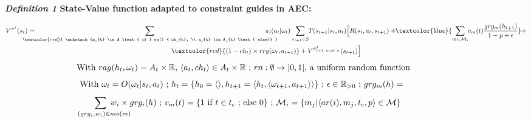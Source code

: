 \begin{figure}[h!]
    \label{eq:single_value_function}
    \raggedright
    \textbf{\textit{Definition 1} \quad State-Value function adapted to constraint guides in AEC:}
    
    \begin{scriptsize}
        \vspace{-0.6cm}
        \begin{gather*}
            V^{\pi^j}(s_t) = \hspace{-0.75cm}
            \sum_{\textcolor{red}{ \substack{a_{t} \in A \text{ if } rn() < ch_{t}, \\
                        a_{t} \in A_{t} \text{ else}}
                }}{\hspace{-0.7cm} \pi_i(a_{t} | \omega_t)}
            \sum_{s_{t+1} \in S}
            {\hspace{-0.1cm} T(s_{t+1} | s_t, a_{t})
            \Bigl[R(s_t,a_{t},s_{t+1}) + \hspace{-0.1cm}
            \textcolor{blue}{ \sum_{m \in \mathcal{M}_i}{ \hspace{-0.1cm} v_m(t) \frac{grg_m(h_{t+1})}{1 - p + \epsilon} } }
            + } \\
            {\textcolor{red}{(1-ch_t) \times rrg(\omega_t,a_{t+1})} + V^{\pi^j_{i+1 \ mod \ n}}(s_{t+1})\Bigr]}
        \end{gather*}
        \vspace{-0.5cm}
        \textcolor{red}{\[\text{ \hspace{-0.1cm} With } rag(h_t, \omega_t) = A_{t} \times \mathbb{R} \text{, } \langle a_t, ch_{t} \rangle \in A_{t} \times \mathbb{R} \text{ ; } rn: \emptyset \to [0,1[ \text{, a uniform random function}\]}
        \vspace{-0.6cm}
        \textcolor{blue}{
            \begin{gather*}
                \hspace{-0.001cm}
                \text{With } \omega_t = O(\omega_t | s_t, a_t) \text{ ; } h_t = \{h_0 = \langle \rangle, h_{t+1} = \langle h_t, \langle \omega_{t+1}, a_{t+1} \rangle \rangle \} \text{ ; } \epsilon \in \mathbb{R}_{>0} \text{ ; } grg_m(h) = 
            \end{gather*}
        }
        \vspace{-0.95cm}
        \textcolor{blue}{
            \begin{gather*}
                \hspace{-0.5cm} \sum_{\hspace{0.3cm}(grg_i,w_i) \in mo(m)}{\hspace{-0.9cm} w_i \times grg_i(h)}
                \text{ ; } v_m(t) = \{ 1 \text{ if } t \in t_c \text{ ; else } 0 \} \text{ ; } \mathcal{M}_i = \{m_j | \langle ar(i),m_j,t_c,p \rangle \in \mathcal{M}\}
            \end{gather*}
        }
        \vspace{-0.6cm}
    \end{scriptsize}
    
\end{figure}

